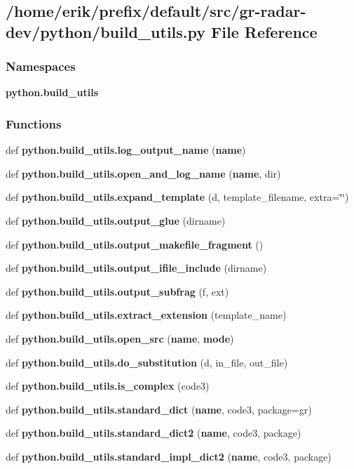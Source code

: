 \subsection{/home/erik/prefix/default/src/gr-\/radar-\/dev/python/build\+\_\+utils.py File Reference}
\label{build__utils_8py}
\subsubsection*{Namespaces}
\begin{DoxyCompactItemize}
\item 
 {\bf python.\+build\+\_\+utils}
\end{DoxyCompactItemize}
\subsubsection*{Functions}
\begin{DoxyCompactItemize}
\item 
def {\bf python.\+build\+\_\+utils.\+log\+\_\+output\+\_\+name} ({\bf name})
\item 
def {\bf python.\+build\+\_\+utils.\+open\+\_\+and\+\_\+log\+\_\+name} ({\bf name}, dir)
\item 
def {\bf python.\+build\+\_\+utils.\+expand\+\_\+template} (d, template\+\_\+filename, extra=\char`\"{}\char`\"{})
\item 
def {\bf python.\+build\+\_\+utils.\+output\+\_\+glue} (dirname)
\item 
def {\bf python.\+build\+\_\+utils.\+output\+\_\+makefile\+\_\+fragment} ()
\item 
def {\bf python.\+build\+\_\+utils.\+output\+\_\+ifile\+\_\+include} (dirname)
\item 
def {\bf python.\+build\+\_\+utils.\+output\+\_\+subfrag} (f, ext)
\item 
def {\bf python.\+build\+\_\+utils.\+extract\+\_\+extension} (template\+\_\+name)
\item 
def {\bf python.\+build\+\_\+utils.\+open\+\_\+src} ({\bf name}, {\bf mode})
\item 
def {\bf python.\+build\+\_\+utils.\+do\+\_\+substitution} (d, in\+\_\+file, out\+\_\+file)
\item 
def {\bf python.\+build\+\_\+utils.\+is\+\_\+complex} (code3)
\item 
def {\bf python.\+build\+\_\+utils.\+standard\+\_\+dict} ({\bf name}, code3, package=\textquotesingle{}gr\textquotesingle{})
\item 
def {\bf python.\+build\+\_\+utils.\+standard\+\_\+dict2} ({\bf name}, code3, package)
\item 
def {\bf python.\+build\+\_\+utils.\+standard\+\_\+impl\+\_\+dict2} ({\bf name}, code3, package)
\end{DoxyCompactItemize}
